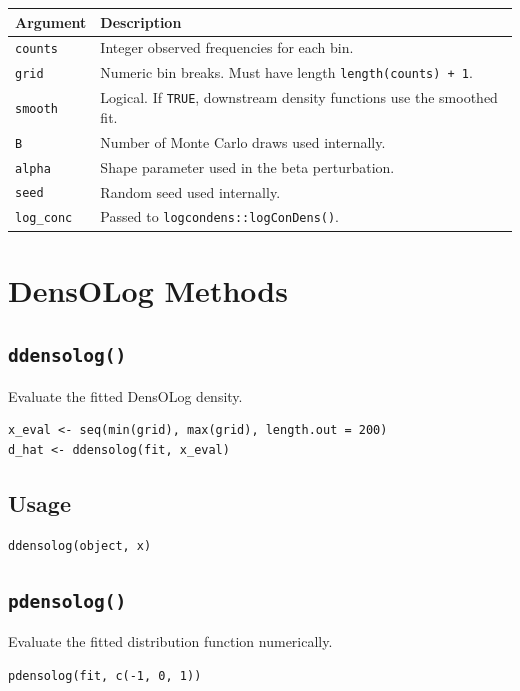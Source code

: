 \documentclass[11pt]{article}
\begin{document}
\begin{tabular}{ll}
\toprule
Argument & Description \\
\midrule
\texttt{counts} & Integer observed frequencies for each bin. \\
\texttt{grid} & Numeric bin breaks. Must have length \texttt{length(counts) + 1}. \\
\texttt{smooth} & Logical. If \texttt{TRUE}, downstream density functions use the smoothed fit. \\
\texttt{B} & Number of Monte Carlo draws used internally. \\
\texttt{alpha} & Shape parameter used in the beta perturbation. \\
\texttt{seed} & Random seed used internally. \\
\texttt{log\_conc} & Passed to \texttt{logcondens::logConDens()}. \\
\bottomrule
\end{tabular}

\section{DensOLog Methods}

\subsection{\texttt{ddensolog()}}

Evaluate the fitted DensOLog density.

\begin{lstlisting}
x_eval <- seq(min(grid), max(grid), length.out = 200)
d_hat <- ddensolog(fit, x_eval)
\end{lstlisting}

\subsection*{Usage}

\begin{lstlisting}
ddensolog(object, x)
\end{lstlisting}

\subsection{\texttt{pdensolog()}}

Evaluate the fitted distribution function numerically.

\begin{lstlisting}
pdensolog(fit, c(-1, 0, 1))
\end{lstlisting}
\end{document}
